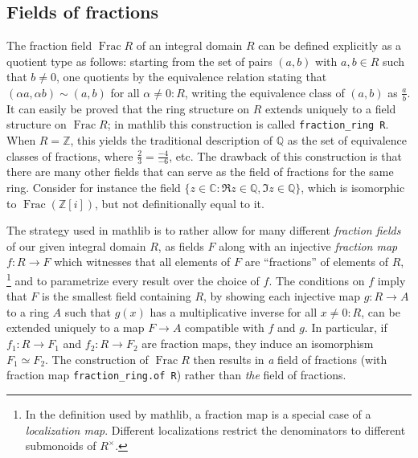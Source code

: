\documentclass[a4paper,USenglish,cleveref, autoref, thm-restate]{lipics-v2021}
\newcommand{\C}{\mathbb{C}}
\newcommand{\lean}[1]{\texttt{#1}\xspace} %
\newcommand{\mathlib}{\textsf{mathlib}\xspace}
\newcommand{\Q}{\mathbb{Q}}
\newcommand{\Z}{\mathbb{Z}}
\DeclareMathOperator{\Frac}{Frac}
\begin{document}
\subsection{Fields of fractions}\label{subsection : fields of fractions}
The fraction field $\Frac R$ of an integral domain $R$ can be defined explicitly as a quotient type as follows:
starting from the set of pairs $(a,b)$ with $a,b \in R$ such that $b\neq 0$,
one quotients by the equivalence relation stating that $(\alpha a, \alpha b) \sim (a,b)$ for all $\alpha \ne 0 : R$, writing the equivalence class of $(a,b)$ as $\frac{a}{b}$.
It can easily be proved that the ring structure on $R$ extends uniquely to a field structure on $\Frac R$;
in \mathlib this construction is called \lean{fraction\_ring R}.
When $R=\Z$, this yields the traditional description of $\Q$ as the set of equivalence classes of fractions, where $\frac{2}{3}=\frac{-4}{-6}$, etc.
The drawback of this construction is that there are many other fields that can serve as the field of fractions for the same ring.
Consider for instance the field $\{z \in \C : \Re z \in \Q, \Im z\in\Q\}$, which is isomorphic to $\Frac (\Z[i])$, but not definitionally equal to it.

The strategy used in \mathlib is to rather allow for many different \emph{fraction fields} of our given integral domain $R$,
as fields $F$ along with an injective \emph{fraction map} $f : R \to F$ which witnesses that all elements of $F$ are ``fractions'' of elements of $R$,%
\footnote{In the definition used by \mathlib, a fraction map is a special case of a \emph{localization map}. Different localizations restrict the denominators to different submonoids of $R^\times$.}
and to parametrize every result over the choice of $f$.
The conditions on $f$ imply that $F$ is the smallest field containing $R$,
by showing each injective map $g \colon R \to A$ to a ring $A$ such that $g(x)$ has a multiplicative inverse for all $x \ne 0 : R$,
can be extended uniquely to a map $F \to A$ compatible with $f$ and $g$.
In particular, if $f_1 \colon R \to F_1$ and $f_2 \colon R \to F_2$ are fraction maps, they induce an isomorphism $F_1 \simeq F_2$.
The construction of $\Frac R$ then results in \emph{a} field of fractions (with fraction map \lean{fraction\_ring.of R}) rather than \emph{the} field of fractions.
\end{document}
